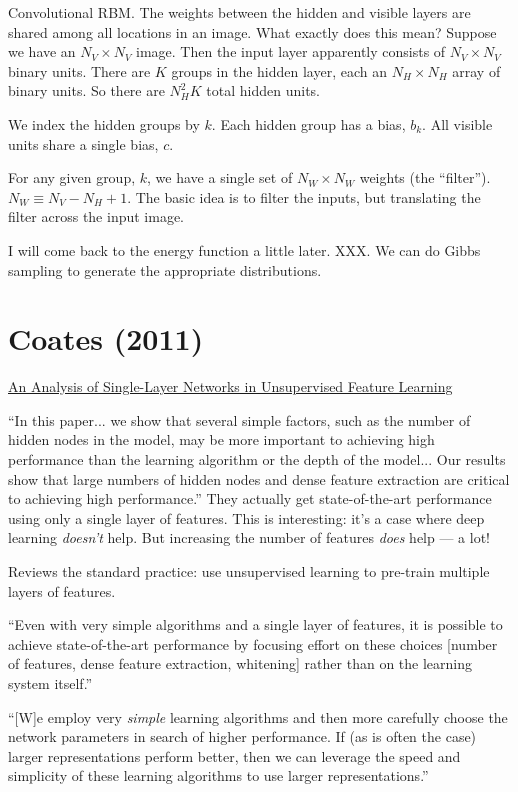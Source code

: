 \documentclass[12pt]{report}
\newcommand{\link}[2]{\href{#1}{#2}}
\begin{document}
Convolutional RBM. The weights between the hidden and visible layers
are shared among all locations in an image.  What exactly does this
mean?  Suppose we have an $N_V \times N_V$ image.  Then the input
layer apparently consists of $N_V \times N_V$ binary units.  There are
$K$ groups in the hidden layer, each an $N_H \times N_H$ array of
binary units.  So there are $N_H^2 K$ total hidden units.

We index the hidden groups by $k$.  Each hidden group has a bias,
$b_k$.  All visible units share a single bias, $c$.

For any given group, $k$, we have a single set of $N_W \times N_W$
weights (the ``filter'').  $N_W \equiv N_V-N_H+1$.  The basic idea is
to filter the inputs, but translating the filter across the input
image.

I will come back to the energy function a little later.  XXX.  We can
do Gibbs sampling to generate the appropriate distributions.

\section{Coates (2011)}

\link{http://www.stanford.edu/~acoates/papers/coatesleeng\_aistats\_2011.pdf}{An
  Analysis of Single-Layer Networks in Unsupervised Feature Learning}

``In this paper... we show that several simple factors, such as the
number of hidden nodes in the model, may be more important to
achieving high performance than the learning algorithm or the depth of
the model... Our results show that large numbers of hidden nodes and
dense feature extraction are critical to achieving high performance.''
They actually get state-of-the-art performance using only a single
layer of features.  This is interesting: it's a case where deep
learning \emph{doesn't} help.  But increasing the number of features
\emph{does} help --- a lot!

Reviews the standard practice: use unsupervised learning to pre-train
multiple layers of features.  

``Even with very simple algorithms and a single layer of features, it
is possible to achieve state-of-the-art performance by focusing effort
on these choices [number of features, dense feature extraction,
whitening] rather than on the learning system itself.''

``[W]e employ very \emph{simple} learning algorithms and then more
carefully choose the network parameters in search of higher
performance.  If (as is often the case) larger representations perform
better, then we can leverage the speed and simplicity of these
learning algorithms to use larger representations.''
\end{document}
